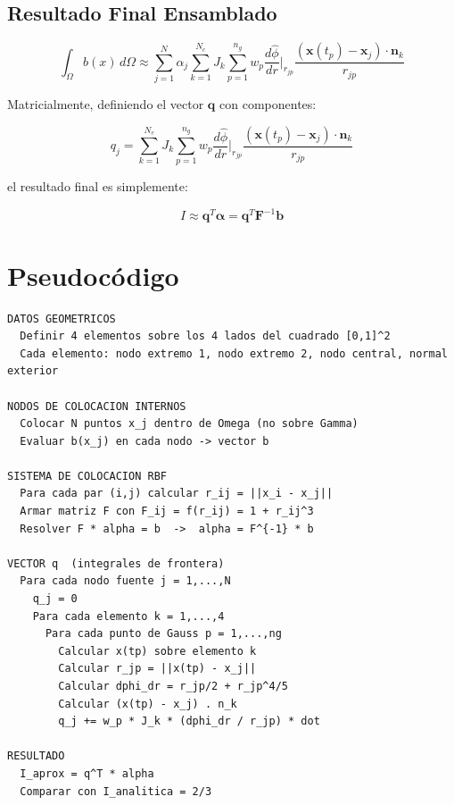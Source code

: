 \documentclass[12pt,a4paper]{article}
\begin{document}
\subsection{Resultado Final Ensamblado}

\begin{equation}
    \int_\Omega b(x)\,d\Omega \approx
    \sum_{j=1}^{N}\alpha_j \sum_{k=1}^{N_e} J_k
    \sum_{p=1}^{n_g} w_p
    \frac{d\hat{\phi}}{dr}\bigg|_{r_{jp}}
    \frac{(\mathbf{x}(t_p)-\mathbf{x}_j)\cdot\mathbf{n}_k}{r_{jp}}
\end{equation}

Matricialmente, definiendo el vector $\mathbf{q}$ con componentes:

\begin{equation}
    q_j = \sum_{k=1}^{N_e} J_k \sum_{p=1}^{n_g} w_p
    \frac{d\hat{\phi}}{dr}\bigg|_{r_{jp}}
    \frac{(\mathbf{x}(t_p)-\mathbf{x}_j)\cdot\mathbf{n}_k}{r_{jp}}
\end{equation}

el resultado final es simplemente:

\begin{equation}
    \boxed{I \approx \mathbf{q}^T\boldsymbol{\alpha}
    = \mathbf{q}^T \mathbf{F}^{-1}\mathbf{b}}
\end{equation}

\section{Pseudocódigo}

\begin{lstlisting}[language={},basicstyle=\ttfamily\small,
                   frame=single,backgroundcolor=\color{gray!5},
                   rulecolor=\color{gray!40}]
DATOS GEOMETRICOS
  Definir 4 elementos sobre los 4 lados del cuadrado [0,1]^2
  Cada elemento: nodo extremo 1, nodo extremo 2, nodo central, normal exterior

NODOS DE COLOCACION INTERNOS
  Colocar N puntos x_j dentro de Omega (no sobre Gamma)
  Evaluar b(x_j) en cada nodo -> vector b

SISTEMA DE COLOCACION RBF
  Para cada par (i,j) calcular r_ij = ||x_i - x_j||
  Armar matriz F con F_ij = f(r_ij) = 1 + r_ij^3
  Resolver F * alpha = b  ->  alpha = F^{-1} * b

VECTOR q  (integrales de frontera)
  Para cada nodo fuente j = 1,...,N
    q_j = 0
    Para cada elemento k = 1,...,4
      Para cada punto de Gauss p = 1,...,ng
        Calcular x(tp) sobre elemento k
        Calcular r_jp = ||x(tp) - x_j||
        Calcular dphi_dr = r_jp/2 + r_jp^4/5
        Calcular (x(tp) - x_j) . n_k
        q_j += w_p * J_k * (dphi_dr / r_jp) * dot

RESULTADO
  I_aprox = q^T * alpha
  Comparar con I_analitica = 2/3
\end{lstlisting}
\end{document}
